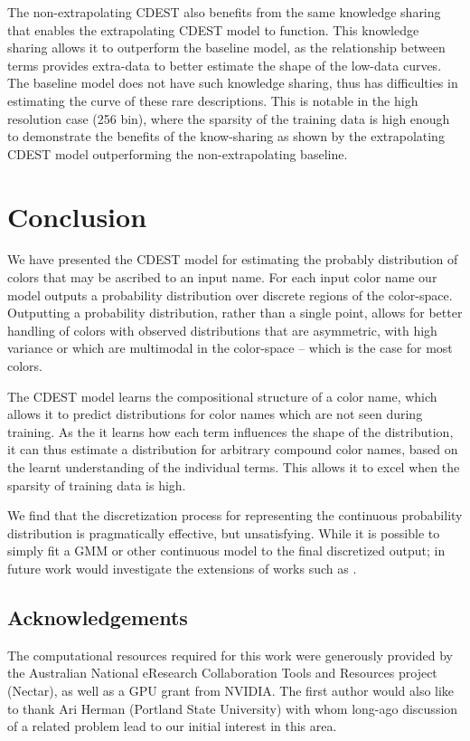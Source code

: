 \documentclass[11pt,a4paper]{article}
\newcommand{\textcite}{\citet}
\begin{document}
The non-extrapolating CDEST also benefits from the same knowledge sharing that enables the extrapolating CDEST model to function.
This knowledge sharing allows it to outperform the baseline model, as the relationship between terms provides extra-data to better estimate the shape of the low-data curves.
The baseline model does not have such knowledge sharing, thus has difficulties in estimating  the curve of these rare descriptions.
This is notable in the high resolution case (256 bin),
where the sparsity of the training data is high enough to demonstrate the benefits of the know-sharing as shown by the extrapolating CDEST model outperforming the non-extrapolating baseline.




\section{Conclusion}\label{sec:conclusion}
We have presented the CDEST model for estimating the probably distribution of colors that may be ascribed to an input name.
For each input color name our model outputs a probability distribution over discrete regions of the color-space.
Outputting a probability distribution, rather than a single point, allows for better handling of colors with observed distributions that are asymmetric, with high variance or which are multimodal in the color-space -- which is the case for most colors.

The CDEST model learns the compositional structure of a color name, which allows it to predict distributions for color names which are not seen during training.
As the it learns how each term influences the shape of the distribution, it can thus estimate a distribution for
arbitrary compound color names, based on the learnt understanding of the individual terms.
This allows it to excel when the sparsity of training data is high.

We find that the discretization process for representing the continuous probability distribution is pragmatically effective, but unsatisfying.
While it is possible to simply fit a GMM or other continuous model to the final discretized output;
in future work would investigate the extensions of works such as \textcite{1998NNpdfDiffCdf, likas2001probability, 2017arXivKernalMixtureNetworks}.


\subsection{Acknowledgements}
The computational resources required for this work were generously provided by the Australian National eResearch Collaboration Tools and Resources project (Nectar),
as well as a GPU grant from NVIDIA.
The first author would also like to thank Ari Herman (Portland State University) with whom long-ago discussion of a related problem lead to our initial interest in this area.

\clearpage


\clearpage
\appendix

\end{document}
